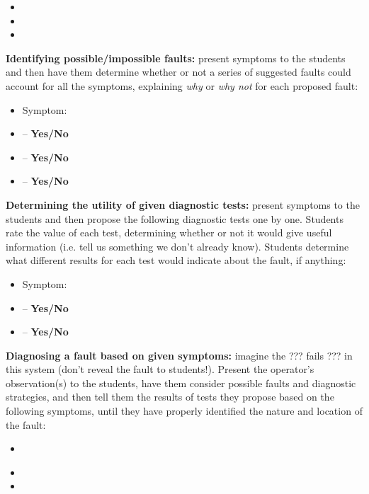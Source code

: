 \begin{itemize}
\item{} 
\item{} 
\item{} 
\end{itemize}


\vskip 10pt


\noindent
{\bf Identifying possible/impossible faults:} present symptoms to the students and then have them determine whether or not a series of suggested faults could account for all the symptoms, explaining {\it why} or {\it why not} for each proposed fault:

\begin{itemize}
\item{} Symptom: {\it }
\item{}  -- {\bf Yes/No}
\item{}  -- {\bf Yes/No}
\item{}  -- {\bf Yes/No}
\end{itemize}


\vskip 10pt


\noindent
{\bf Determining the utility of given diagnostic tests:} present symptoms to the students and then propose the following diagnostic tests one by one.  Students rate the value of each test, determining whether or not it would give useful information (i.e. tell us something we don't already know).  Students determine what different results for each test would indicate about the fault, if anything:

\begin{itemize}
\item{} Symptom: {\it }
\item{}  -- {\bf Yes/No}
\item{}  -- {\bf Yes/No}
\end{itemize}


\vskip 10pt


\noindent
{\bf Diagnosing a fault based on given symptoms:} imagine the ??? fails ??? in this system (don't reveal the fault to students!).  Present the operator's observation(s) to the students, have them consider possible faults and diagnostic strategies, and then tell them the results of tests they propose based on the following symptoms, until they have properly identified the nature and location of the fault:

\begin{itemize}
\item{} {\it }
\item{} 
\item{} 
\end{itemize}



